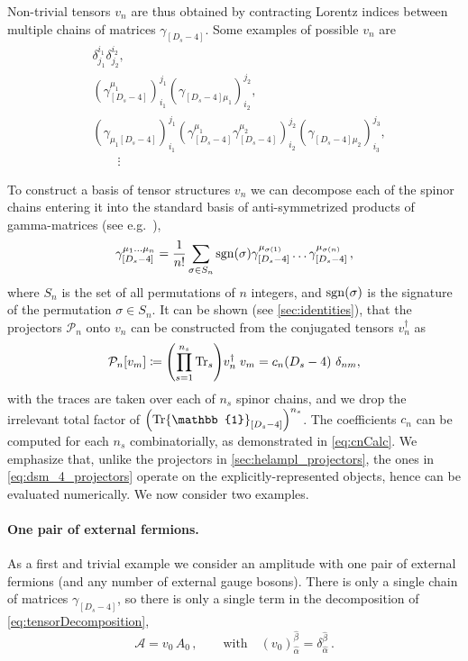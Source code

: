Non-trivial tensors $v_n$ are thus obtained by contracting
Lorentz indices between multiple chains of  matrices $\gamma_{[D_s-4]}$.
Some examples of possible $v_n$ are
\begin{equation}
  \begin{aligned}
    & \delta^{i_1}_{j_1} \delta^{i_2}_{j_2},\\
    & (\gamma_{[D_s-4]}^{\mu_1} )_{i_1}^{j_1} (\gamma_{[D_s-4]\mu_1}^{\phantom{\mu}})_{i_2}^{j_2}, \\
    & (\gamma_{\mu_1[D_s-4]}^{\phantom{\mu}} )_{i_1}^{j_1} (\gamma_{[D_s-4]}^{\mu_1}\gamma_{[D_s-4]}^{\mu_2} )_{i_2}^{j_2} (\gamma_{[D_s-4]\mu_2}^{\phantom{\mu}})_{i_3}^{j_3},\\
    & \qquad \vdots{}
  \end{aligned}
\end{equation}

To construct a basis of tensor structures $v_n$ we can decompose each of the spinor chains entering it
into the standard basis of anti-symmetrized products of gamma-matrices (see e.g.\ \cite{Veltman:1988au}),
\begin{align}\label{eq:basisGammaChainDs}
\gamma_{[D_s-4]}^{\mu_1 \ldots \mu_n} = \frac{1}{n!} \sum_{ \sigma\in S_n} \operatorname{sgn}(\sigma) \gamma_{[D_s-4]}^{\mu_{\sigma(1)}} \ldots \gamma_{[D_s-4]}^{\mu_{\sigma(n)}}\,,
\end{align}
where $S_n$ is the set of all permutations of $n$ integers, and $\operatorname{sgn}(\sigma)$ is the signature of the permutation $\sigma\in S_n$.
It can be shown (see \cref{sec:identities}), that the
projectors $\mathcal{P}_n$ onto $v_n$ can be constructed from the conjugated tensors $v_n^\dagger$ as
\begin{align} \label{eq:dsm_4_projectors}
  \mathcal{P}_n [v_m] \coloneqq \qty(\prod_{s=1}^{n_s} \Tr_s) v_n^\dagger\; v_m = c_n(D_s-4)~\delta_{n m},  %
\end{align}
with the traces are taken over each of $n_s$ spinor chains, and we drop the irrelevant total factor of $\qty(\Tr\mathbb{1}_{[D_s -4 ]})^{n_s}$.
The coefficients $c_n$ can be computed for each $n_s$ combinatorially, as demonstrated in \cref{eq:cnCalc}.
We emphasize that, unlike the projectors in \cref{sec:helampl_projectors}, the ones in \cref{eq:dsm_4_projectors}
operate on the explicitly-represented objects, hence can be evaluated numerically.
We now consider two examples.

\paragraph{One pair of external fermions.}
As a first and trivial example we consider an amplitude with one pair of external fermions (and any number of external gauge bosons). 
There is only a single chain of matrices $\gamma_{[D_s-4]}$, so
there is only a single term in the decomposition of \cref{eq:tensorDecomposition},
\begin{equation}\label{eq:decompqqbar}
  \mathcal{A} =v_0\,A_0\,,\qquad \textrm{with}\quad (v_0)_{\hat{\alpha}}^{\hat{\beta}}=\delta_{\hat{\alpha}}^{\hat{\beta}}\,.
\end{equation}

